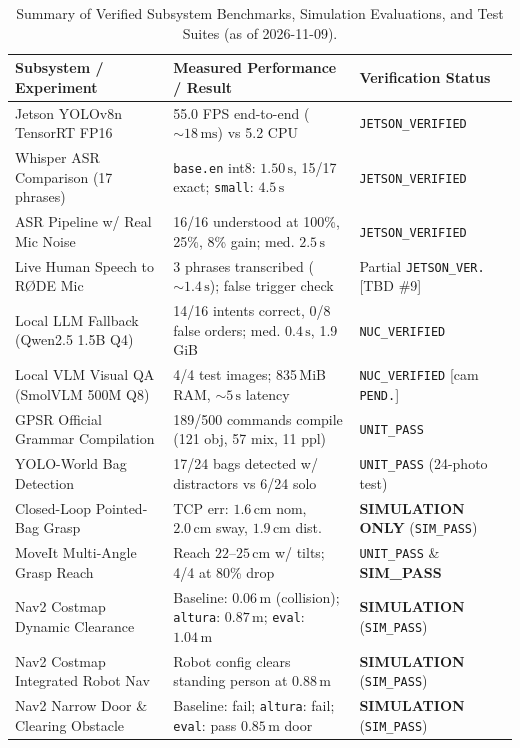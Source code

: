 \documentclass[runningheads,a4paper]{llncs}
\begin{document}
\begin{table}[tb]
\caption{Summary of Verified Subsystem Benchmarks, Simulation Evaluations, and Test Suites (as of 2026-11-09).}
\label{tab:benchmarks}
\centering
\small
\begin{tabular}{lll}
\toprule
\textbf{Subsystem / Experiment} & \textbf{Measured Performance / Result} & \textbf{Verification Status} \\
\midrule
Jetson YOLOv8n TensorRT FP16 & 55.0 FPS end-to-end ($\sim 18\,\text{ms}$) vs 5.2 CPU & \texttt{JETSON\_VERIFIED} \\
Whisper ASR Comparison (17 phrases) & \texttt{base.en} int8: $1.50\,\text{s}$, 15/17 exact; \texttt{small}: $4.5\,\text{s}$ & \texttt{JETSON\_VERIFIED} \\
ASR Pipeline w/ Real Mic Noise & 16/16 understood at 100\%, 25\%, 8\% gain; med. $2.5\,\text{s}$ & \texttt{JETSON\_VERIFIED} \\
Live Human Speech to R\O{}DE Mic & 3 phrases transcribed ($\sim 1.4\,\text{s}$); false trigger check & Partial \texttt{JETSON\_VER.} [TBD \#9] \\
Local LLM Fallback (Qwen2.5 1.5B Q4) & 14/16 intents correct, 0/8 false orders; med. $0.4\,\text{s}$, 1.9\,GiB & \texttt{NUC\_VERIFIED} \\
Local VLM Visual QA (SmolVLM 500M Q8) & 4/4 test images; 835\,MiB RAM, $\sim 5\,\text{s}$ latency & \texttt{NUC\_VERIFIED} [cam \texttt{PEND.}] \\
GPSR Official Grammar Compilation & 189/500 commands compile (121 obj, 57 mix, 11 ppl) & \texttt{UNIT\_PASS} \\
YOLO-World Bag Detection & 17/24 bags detected w/ distractors vs 6/24 solo & \texttt{UNIT\_PASS} (24-photo test) \\
Closed-Loop Pointed-Bag Grasp & TCP err: $1.6\,\text{cm}$ nom, $2.0\,\text{cm}$ sway, $1.9\,\text{cm}$ dist. & \textbf{SIMULATION ONLY} (\texttt{SIM\_PASS}) \\
MoveIt Multi-Angle Grasp Reach & Reach $22$--$25\,\text{cm}$ w/ tilts; 4/4 at 80\% drop & \texttt{UNIT\_PASS} \& \textbf{SIM\_PASS} \\
Nav2 Costmap Dynamic Clearance & Baseline: $0.06\,\text{m}$ (collision); \texttt{altura}: $0.87\,\text{m}$; \texttt{eval}: $1.04\,\text{m}$ & \textbf{SIMULATION} (\texttt{SIM\_PASS}) \\
Nav2 Costmap Integrated Robot Nav & Robot config clears standing person at $0.88\,\text{m}$ & \textbf{SIMULATION} (\texttt{SIM\_PASS}) \\
Nav2 Narrow Door \& Clearing Obstacle & Baseline: fail; \texttt{altura}: fail; \texttt{eval}: pass $0.85\,\text{m}$ door & \textbf{SIMULATION} (\texttt{SIM\_PASS}) \\

\end{tabular}
\end{table}
\end{document}
